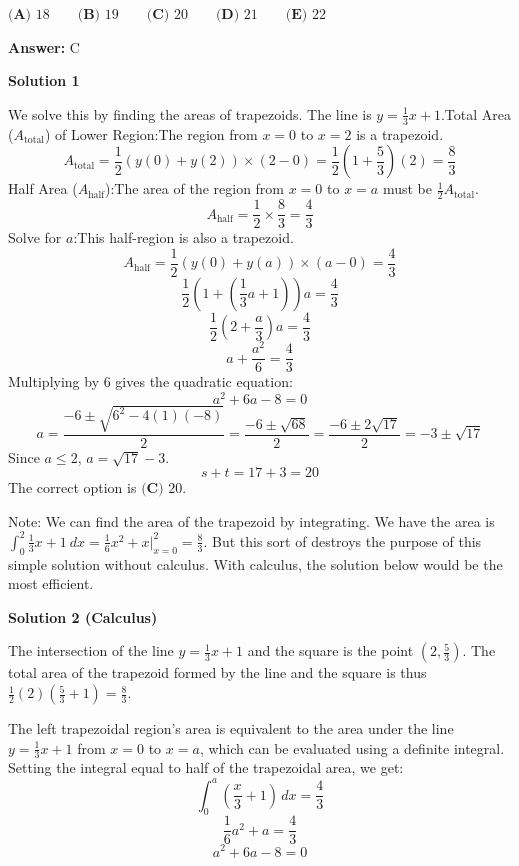 \begin{enumerate}
 $\textbf{(A) } 18 \qquad\textbf{(B) } 19 \qquad\textbf{(C) }20\qquad\textbf{(D) } 21 \qquad\textbf{(E) } 22$

 \textbf{Answer: }C



\textbf{Solution 1}

We solve this by finding the areas of trapezoids. The line is $y = \frac{1}{3}x + 1$.Total Area ($A_{\text{total}}$) of Lower Region:The region from $x=0$ to $x=2$ is a trapezoid.
 \[A_{\text{total}} = \frac{1}{2}(y(0) + y(2)) \times (2 - 0) = \frac{1}{2}\left(1 + \frac{5}{3}\right)(2) = \frac{8}{3}\]Half Area ($A_{\text{half}}$):The area of the region from $x=0$ to $x=a$ must be $\frac{1}{2}A_{\text{total}}$.
 \[A_{\text{half}} = \frac{1}{2} \times \frac{8}{3} = \frac{4}{3}\]Solve for $a$:This half-region is also a trapezoid.
 \[A_{\text{half}} = \frac{1}{2}(y(0) + y(a)) \times (a - 0) = \frac{4}{3}\]
 \[\frac{1}{2}\left(1 + \left(\frac{1}{3}a + 1\right)\right)a = \frac{4}{3}\]
 \[\frac{1}{2}\left(2 + \frac{a}{3}\right)a = \frac{4}{3}\]
 \[a + \frac{a^2}{6} = \frac{4}{3}\]Multiplying by 6 gives the quadratic equation:
 \[a^2 + 6a - 8 = 0\]
 \[a = \frac{-6 \pm \sqrt{6^2 - 4(1)(-8)}}{2} = \frac{-6 \pm \sqrt{68}}{2} = \frac{-6 \pm 2\sqrt{17}}{2} = -3 \pm \sqrt{17}\]Since $a\leq 2$, $a = \sqrt{17} - 3$.
 \[s + t = 17 + 3 = 20\]The correct option is $\boxed{\textbf{(C) } 20}$.

 Note: We can find the area of the trapezoid by integrating. We have the area is $\int_{0}^{2} \frac{1}{3}x + 1 \ dx = \frac{1}{6}x^2 + x \bigg|_{x=0}^{2} = \frac{8}{3}$. But this sort of destroys the purpose of this simple solution without calculus. With calculus, the solution below would be the most efficient.

 



\textbf{Solution 2 (Calculus)}

The intersection of the line $y = \frac{1}{3}x + 1$ and the square is the point $(2, \frac{5}{3})$. The total area of the trapezoid formed by the line and the square is thus $\frac{1}{2}(2)(\frac{5}{3} + 1) = \frac{8}{3}$. 

 The left trapezoidal region's area is equivalent to the area under the line $y = \frac{1}{3}x + 1$ from $x = 0$ to $x = a$, which can be evaluated using a definite integral. Setting the integral equal to half of the trapezoidal area, we get:
 \[\int_{0}^{a} \left(\frac{x}{3} + 1\right)\, dx = \frac{4}{3}\]
 \[\frac{1}{6}a^2 + a = \frac{4}{3}\]
 \[a^2 + 6a - 8 = 0\]


\end{enumerate}
